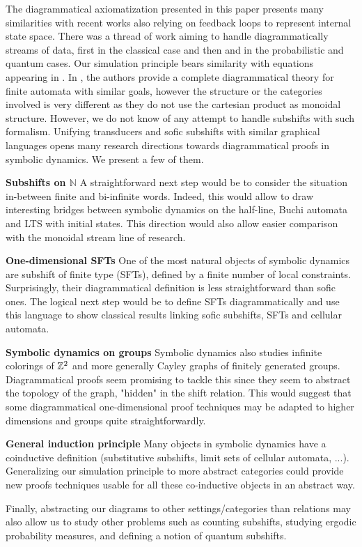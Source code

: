 
The diagrammatical axiomatization presented in this paper presents many similarities with recent works also relying on feedback loops to represent internal state space.
There was a thread of work aiming to handle diagrammatically streams of data, first \cite{sprunger2019differentiable} in the classical case and then \cite{di2022monoidal} and \cite{carette2021graphical} in the probabilistic and quantum cases.
Our simulation principle bears similarity with equations appearing in \cite{ghica2022fully}.
In \cite{piedeleu2021string}, the authors provide a complete diagrammatical theory for finite automata with similar goals, however the structure or the categories involved is very different as they do not use the cartesian product as monoidal structure.
However, we do not know of any attempt to handle subshifts with such formalism.
Unifying transducers and sofic subshifts with similar graphical languages opens many research directions towards diagrammatical proofs in symbolic dynamics. We present a few of them.

\textbf{Subshifts on $\mathbb{N}$} A straightforward next step would be to consider the situation in-between finite and bi-infinite words. Indeed, this would allow to draw interesting bridges between symbolic dynamics on the half-line, Buchi automata and LTS with initial states. This direction would also allow easier comparison with the monoidal stream line of research. 

\textbf{One-dimensional SFTs} One of the most natural objects of symbolic dynamics are subshift of finite type (SFTs), defined by a finite number of local constraints.
Surprisingly, their diagrammatical definition is less straightforward than sofic ones.
The logical next step would be to define SFTs diagrammatically and use this language to show classical results linking sofic subshifts, SFTs and cellular automata.

\textbf{Symbolic dynamics on groups} Symbolic dynamics also studies infinite colorings of ${\mathbb{Z}}^2$ and more generally Cayley graphs of finitely generated groups. 
Diagrammatical proofs seem promising to tackle this since they seem to abstract the topology of the graph, "hidden" in the shift relation.
This would suggest that some diagrammatical one-dimensional proof techniques may be adapted to higher dimensions and groups quite straightforwardly.

\textbf{General induction principle} Many objects in symbolic dynamics have a coinductive definition (substitutive subshifts, limit sets of cellular automata, ...). 
Generalizing our simulation principle to more abstract categories could provide new proofs techniques usable for all these co-inductive objects in an abstract way.

Finally, abstracting our diagrams to other settings/categories than relations may also allow us to study other problems such as counting subshifts, studying ergodic probability measures, and defining a notion of quantum subshifts.  
